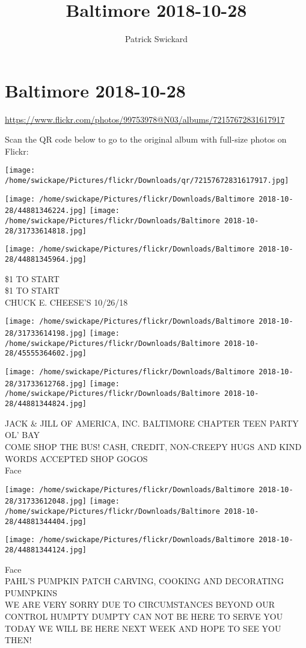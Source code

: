 \documentclass[10pt,letterpaper]{article}
\title{Baltimore 2018-10-28}
\author{Patrick Swickard}
\date{}
\begin{document}
\section*{Baltimore 2018-10-28}

\url{https://www.flickr.com/photos/99753978@N03/albums/72157672831617917}

Scan the QR code below to go to the original album with full-size photos on Flickr:

\texttt{[image: /home/swickape/Pictures/flickr/Downloads/qr/72157672831617917.jpg]}
\pagebreak

\texttt{[image: /home/swickape/Pictures/flickr/Downloads/Baltimore 2018-10-28/44881346224.jpg]}
\texttt{[image: /home/swickape/Pictures/flickr/Downloads/Baltimore 2018-10-28/31733614818.jpg]}

\vspace{0.25in}
\texttt{[image: /home/swickape/Pictures/flickr/Downloads/Baltimore 2018-10-28/44881345964.jpg]}

\$1 TO START\\
\$1 TO START\\
CHUCK E. CHEESE'S 10/26/18
\pagebreak

\texttt{[image: /home/swickape/Pictures/flickr/Downloads/Baltimore 2018-10-28/31733614198.jpg]}
\texttt{[image: /home/swickape/Pictures/flickr/Downloads/Baltimore 2018-10-28/45555364602.jpg]}

\texttt{[image: /home/swickape/Pictures/flickr/Downloads/Baltimore 2018-10-28/31733612768.jpg]}
\texttt{[image: /home/swickape/Pictures/flickr/Downloads/Baltimore 2018-10-28/44881344824.jpg]}

JACK \& JILL OF AMERICA, INC. BALTIMORE CHAPTER TEEN PARTY\\
OL' BAY\\
COME SHOP THE BUS!  CASH, CREDIT, NON{-}CREEPY HUGS AND KIND WORDS ACCEPTED SHOP GOGOS\\
Face
\pagebreak

\texttt{[image: /home/swickape/Pictures/flickr/Downloads/Baltimore 2018-10-28/31733612048.jpg]}
\texttt{[image: /home/swickape/Pictures/flickr/Downloads/Baltimore 2018-10-28/44881344404.jpg]}

\texttt{[image: /home/swickape/Pictures/flickr/Downloads/Baltimore 2018-10-28/44881344124.jpg]}

Face\\
PAHL'S PUMPKIN PATCH CARVING, COOKING AND DECORATING PUMNPKINS\\
WE ARE VERY SORRY DUE TO CIRCUMSTANCES BEYOND OUR CONTROL HUMPTY DUMPTY CAN NOT BE HERE TO SERVE YOU TODAY WE WILL BE HERE NEXT WEEK AND HOPE TO SEE YOU THEN!
\pagebreak
\end{document}
